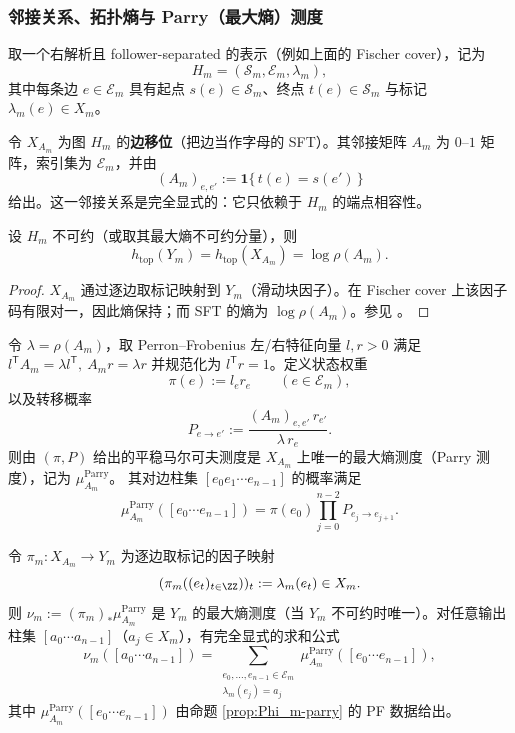 \subsubsection{邻接关系、拓扑熵与 Parry（最大熵）测度}\label{subsubsec:Ym-adjacency-entropy-parry}
取一个右解析且 follower-separated 的表示（例如上面的 Fischer cover），记为
\[
H_m=(\mathcal{S}_m,\mathcal{E}_m,\lambda_m),
\]
其中每条边 $e\in\mathcal{E}_m$ 具有起点 $s(e)\in\mathcal{S}_m$、终点 $t(e)\in\mathcal{S}_m$ 与标记 $\lambda_m(e)\in X_m$。

\begin{definition}\label{def:Phi_m-adjacency}
令 $X_{A_m}$ 为图 $H_m$ 的\textbf{边移位}（把边当作字母的 SFT）。其邻接矩阵 $A_m$ 为 $0$--$1$ 矩阵，索引集为 $\mathcal{E}_m$，并由
\[
(A_m)_{e,e'}:=\mathbf{1}\{\,t(e)=s(e')\,\}
\]
给出。这一邻接关系是完全显式的：它只依赖于 $H_m$ 的端点相容性。
\end{definition}

\begin{proposition}[拓扑熵的可计算公式]\label{prop:Phi_m-entropy}
设 $H_m$ 不可约（或取其最大熵不可约分量），则
\[
h_{\mathrm{top}}(Y_m)=h_{\mathrm{top}}(X_{A_m})=\log\rho(A_m).
\]
\end{proposition}

\begin{proof}
$X_{A_m}$ 通过逐边取标记映射到 $Y_m$（滑动块因子）。在 Fischer cover 上该因子码有限对一，因此熵保持；而 SFT 的熵为 $\log\rho(A_m)$。参见 \cite{LindMarcus1995,Kitchens1998SymbolicDynamics}。
\end{proof}

\begin{proposition}\label{prop:Phi_m-parry}
令 $\lambda=\rho(A_m)$，取 Perron--Frobenius 左/右特征向量 $l,r>0$ 满足
\(
l^{\mathsf T}A_m=\lambda l^{\mathsf T},\ A_m r=\lambda r
\)
并规范化为 $l^{\mathsf T}r=1$。定义状态权重
\[
\pi(e):=l_e r_e\qquad (e\in\mathcal{E}_m),
\]
以及转移概率
\[
P_{e\to e'}:=\frac{(A_m)_{e,e'}\,r_{e'}}{\lambda\, r_e}.
\]
则由 $(\pi,P)$ 给出的平稳马尔可夫测度是 $X_{A_m}$ 上唯一的最大熵测度（Parry 测度），记为 $\mu_{A_m}^{\mathrm{Parry}}$。
其对边柱集 $[e_0e_1\cdots e_{n-1}]$ 的概率满足
\[
\mu_{A_m}^{\mathrm{Parry}}([e_0\cdots e_{n-1}])=\pi(e_0)\prod_{j=0}^{n-2} P_{e_j\to e_{j+1}}.
\]
\end{proposition}

\begin{proposition}\label{prop:Phi_m-parry-pushforward}
令 $\pi_m:X_{A_m}\to Y_m$ 为逐边取标记的因子映射
\[
(\pi_m((e_t)_{t\in\ZZ}))_t:=\lambda_m(e_t)\in X_m.
\]
则 $\nu_m:=({\pi_m})_*\mu_{A_m}^{\mathrm{Parry}}$ 是 $Y_m$ 的最大熵测度（当 $Y_m$ 不可约时唯一）。对任意输出柱集 $[a_0\cdots a_{n-1}]$（$a_j\in X_m$），有完全显式的求和公式
\[
\nu_m([a_0\cdots a_{n-1}])
=
\sum_{\substack{e_0,\dots,e_{n-1}\in\mathcal{E}_m\\ \lambda_m(e_j)=a_j}}
\mu_{A_m}^{\mathrm{Parry}}([e_0\cdots e_{n-1}]),
\]
其中 $\mu_{A_m}^{\mathrm{Parry}}([e_0\cdots e_{n-1}])$ 由命题 \ref{prop:Phi_m-parry} 的 PF 数据给出。
\end{proposition}

